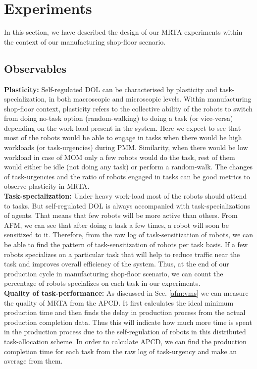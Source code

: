 \documentclass[preprint,12pt]{elsarticle}
\begin{document}
\section{Experiments}
\label{sec:expt}
In this section, we have described the design of our MRTA experiments within the context of our manufacturing shop-floor scenario. 
\subsection{Observables}
\textbf{Plasticity:} %
Self-regulated DOL can be characterised by plasticity and task-specialization, in both macroscopic and microscopic levels. Within manufacturing shop-floor context, plasticity refers to the collective ability of the robots to switch from doing no-task option (random-walking) to doing a task (or vice-versa) depending on the work-load present in the system. Here we expect to see that most of the robots would be able to engage in tasks when there would be high workloads (or task-urgencies) during PMM. Similarity, when there would be low workload in case of MOM only a few robots would do the task, rest of them would either be idle (not doing any task) or perform a random-walk.  The changes of task-urgencies and the ratio of robots engaged in tasks can be good metrics to observe plasticity in MRTA.\\
\textbf{Task-specialization:} Under heavy work-load most of the robots should attend to tasks. But self-regulated DOL is always accompanied with task-specializations of agents. That means that few robots will be more active than others. From AFM, we can see that after doing a task a few times, a robot will soon be sensitized to it. Therefore, from the raw log of task-sensitization of robots, we can be able to find the pattern of task-sensitization of robots per task basis. If a few robots specializes on a particular task that will help to reduce traffic near the task and improves overall efficiency of the system. Thus, at the end of our production cycle in manufacturing shop-floor scenario, we can count the percentage of robots specializes on each task in our experiments.\\
\textbf{Quality of task-performance:} As discussed in Sec. \ref{afm:vms} we can measure the quality of MRTA from the APCD. It first calculates the ideal minimum production time and then finds the delay in production process from the actual production completion data. Thus this will indicate how much more time is  spent in the production process due to the self-regulation of robots in this distributed task-allocation scheme.  In order to calculate APCD, we can find the production completion time for each task from the raw log of task-urgency and make an average from them.\\
\end{document}
